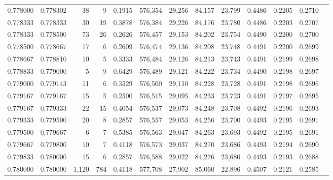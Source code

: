 \begin{tabular}{rrrrrrrrrrrrr}
0.778000 & 0.778302 &    38 &   9 &                                     0.1915 & 576,354 &  29,256 &  84,157 &  23,799 & 0.4486 & 0.2205 & 0.2710 \\
0.778333 & 0.778333 &    30 &  19 &                                     0.3878 & 576,384 &  29,226 &  84,176 &  23,780 & 0.4486 & 0.2203 & 0.2707 \\
0.778333 & 0.778500 &    73 &  26 &                                     0.2626 & 576,457 &  29,153 &  84,202 &  23,754 & 0.4490 & 0.2200 & 0.2700 \\
0.778500 & 0.778667 &    17 &   6 &                                     0.2609 & 576,474 &  29,136 &  84,208 &  23,748 & 0.4491 & 0.2200 & 0.2699 \\
0.778667 & 0.778810 &    10 &   5 &                                     0.3333 & 576,484 &  29,126 &  84,213 &  23,743 & 0.4491 & 0.2199 & 0.2698 \\
0.778833 & 0.779000 &     5 &   9 &                                     0.6429 & 576,489 &  29,121 &  84,222 &  23,734 & 0.4490 & 0.2198 & 0.2697 \\
0.779000 & 0.779143 &    11 &   6 &                                     0.3529 & 576,500 &  29,110 &  84,228 &  23,728 & 0.4491 & 0.2198 & 0.2696 \\
0.779167 & 0.779167 &    15 &   5 &                                     0.2500 & 576,515 &  29,095 &  84,233 &  23,723 & 0.4491 & 0.2197 & 0.2695 \\
0.779167 & 0.779333 &    22 &  15 &                                     0.4054 & 576,537 &  29,073 &  84,248 &  23,708 & 0.4492 & 0.2196 & 0.2693 \\
0.779333 & 0.779500 &    20 &   8 &                                     0.2857 & 576,557 &  29,053 &  84,256 &  23,700 & 0.4493 & 0.2195 & 0.2691 \\
0.779500 & 0.779667 &     6 &   7 &                                     0.5385 & 576,563 &  29,047 &  84,263 &  23,693 & 0.4492 & 0.2195 & 0.2691 \\
0.779667 & 0.779800 &    10 &   7 &                                     0.4118 & 576,573 &  29,037 &  84,270 &  23,686 & 0.4493 & 0.2194 & 0.2690 \\
0.779833 & 0.780000 &    15 &   6 &                                     0.2857 & 576,588 &  29,022 &  84,276 &  23,680 & 0.4493 & 0.2193 & 0.2688 \\
0.780000 & 0.780000 & 1,120 & 784 &                                     0.4118 & 577,708 &  27,902 &  85,060 &  22,896 & 0.4507 & 0.2121 & 0.2585 \\

\end{tabular}
